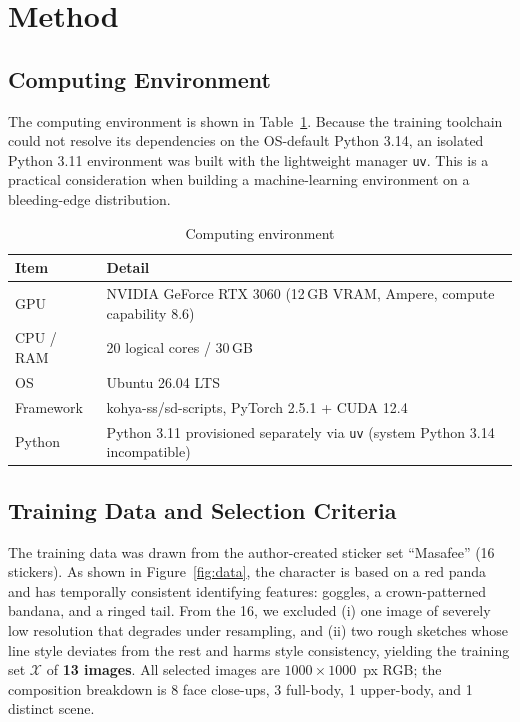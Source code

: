 \documentclass[10pt,twocolumn]{article}
\begin{document}
\section{Method}
\subsection{Computing Environment}
The computing environment is shown in Table~\ref{tab:env}. Because the training toolchain could not resolve its dependencies on the OS-default Python 3.14, an isolated Python 3.11 environment was built with the lightweight manager \texttt{uv}. This is a practical consideration when building a machine-learning environment on a bleeding-edge distribution.

\begin{table}[t]\centering\small
\caption{Computing environment}
\label{tab:env}
\begin{tabular}{ll}
\toprule
Item & Detail \\
\midrule
GPU & NVIDIA GeForce RTX 3060 (12\,GB VRAM, Ampere, compute capability 8.6) \\
CPU / RAM & 20 logical cores / 30\,GB \\
OS & Ubuntu 26.04 LTS \\
Framework & kohya-ss/sd-scripts, PyTorch 2.5.1 + CUDA 12.4 \\
Python & Python 3.11 provisioned separately via \texttt{uv} (system Python 3.14 incompatible) \\
\bottomrule
\end{tabular}
\end{table}

\subsection{Training Data and Selection Criteria}
The training data was drawn from the author-created sticker set ``Masafee'' (16 stickers). As shown in Figure~\ref{fig:data}, the character is based on a red panda and has temporally consistent identifying features: goggles, a crown-patterned bandana, and a ringed tail. From the 16, we excluded (i) one image of severely low resolution that degrades under resampling, and (ii) two rough sketches whose line style deviates from the rest and harms style consistency, yielding the training set $\mathcal{X}$ of \textbf{13 images}. All selected images are $1000\times1000$~px RGB; the composition breakdown is 8 face close-ups, 3 full-body, 1 upper-body, and 1 distinct scene.
\end{document}
